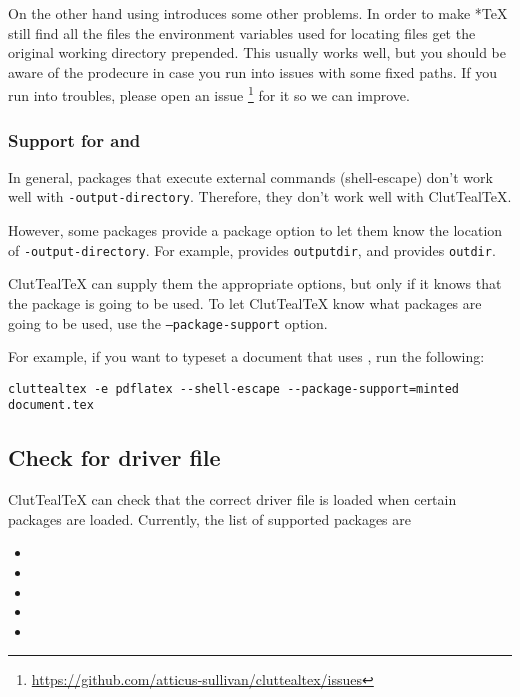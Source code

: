 \documentclass[a4paper, 11pt]{scrartcl}
\let\TeXold\TeX
\newcommand\CluttealTeX{ClutTeal\TeX\xspace}
\renewcommand\TeX{\TeXold\xspace}
\begin{document}
On the other hand using  introduces some other problems.
In order to make *\TeX still find all the files the environment variables used for locating files get the original working directory prepended.
This usually works well, but you should be aware of the prodecure in case you run into issues with some fixed paths.
If you run into troubles, please open an issue \footnote{\url{https://github.com/atticus-sullivan/cluttealtex/issues}} for it so we can improve.

\subsubsection{Support for  and } \label{sec:supp-pkg}
In general, packages that execute external commands (shell-escape) don't work well with \texttt{-output-directory}.
Therefore, they don't work well with \CluttealTeX.

However, some packages provide a package option to let them know the location of \texttt{-output-directory}.
For example,  provides \texttt{outputdir}, and  provides \texttt{outdir}.

\CluttealTeX can supply them the appropriate options, but only if it knows that the package is going to be used.
To let \CluttealTeX know what packages are going to be used, use the \texttt{--package-support} option.

For example, if you want to typeset a document that uses , run the following:
\begin{verbatim}
cluttealtex -e pdflatex --shell-escape --package-support=minted document.tex
\end{verbatim}

\subsection{Check for driver file}

\CluttealTeX can check that the correct driver file is loaded when certain packages are loaded.
Currently, the list of supported packages are
\begin{multicols}{3}
	\begin{itemize}
		\item {}
		\item {}
		\item {}
		\item {}
		\item {}
	\end{itemize}
\end{multicols}
\end{document}
